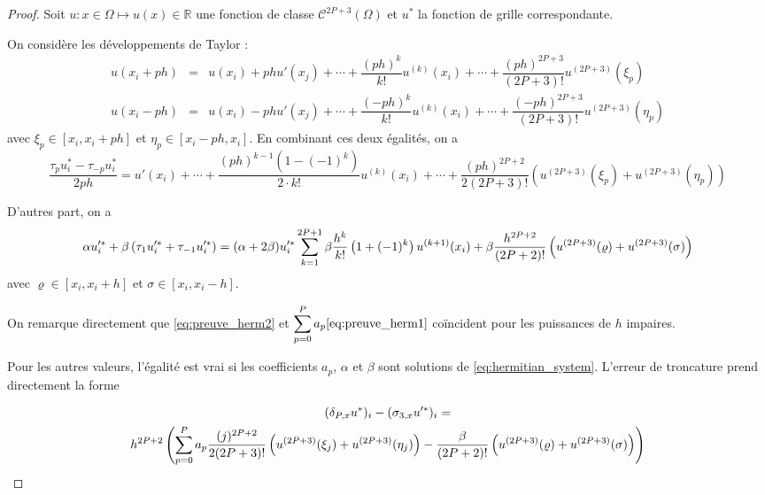 \begin{proof}
Soit $u : x \in \Omega \mapsto u(x) \in \mathbb{R}$ une fonction de classe $\mathcal{C}^{2P+3}( \Omega)$ et $u^*$ la fonction de grille correspondante.

On considère les développements de Taylor :
\begin{equation}
\begin{array}{rcl}
u(x_i + ph) & = & u(x_i) + p h u'(x_j) + \cdots + \dfrac{(ph)^k}{k!}u^{(k)}(x_i) + \cdots +\dfrac{(ph)^{2P+3}}{(2P+3)!} u^{(2P+3)}(\xi_p)\\
u(x_i - ph) & = & u(x_i) - p h u'(x_j) + \cdots + \dfrac{(-ph)^k}{k!}u^{(k)}(x_i) + \cdots +\dfrac{(-ph)^{2P+3}}{(2P+3)!} u^{(2P+3)}(\eta_p)
\end{array}
\end{equation}
avec $\xi_p \in [x_i, x_i+ph]$ et $\eta_p \in [x_i-ph, x_i]$. En combinant ces deux égalités, on a
\begin{equation}
\dfrac{\tau_pu^*_i - \tau_{-p} u^*_i}{2ph} = u'(x_i) + \cdots + \dfrac{(ph)^{k-1}(1 - (-1)^k)}{2 \cdot k!} u^{(k)}(x_i) + \cdots +\dfrac{(ph)^{2P+2}}{2(2P+3)!} \left( u^{(2P+3)}(\xi_p) + u^{(2P+3)}(\eta_p) \right)
\label{eq:preuve_herm1}
\end{equation}

D'autres part, on a 
\begin{equation}
\alpha u'^*_i + \beta \left( \tau_1 u'^*_{i} + \tau_{-1} u'^*_{i} \right) = (\alpha + 2 \beta) u'^*_i \displaystyle\sum\limits_{k=1}^{2P+1} \beta \dfrac{h^{k}}{k!} \left( 1 + (-1)^k \right) u^{(k+1)}(x_i)+ \beta \dfrac{h^{2P+2}}{(2P+2)!} \left(u^{(2P+3)}(\varrho) + u^{(2P+3)}(\sigma) \right) 
\label{eq:preuve_herm2}
\end{equation}
avec $\varrho \in [x_i, x_i + h]$ et $\sigma \in [x_i, x_i - h]$. 

On remarque directement que \eqref{eq:preuve_herm2} et $\displaystyle\sum\limits_{p=0}^P a_p  \eqref{eq:preuve_herm1}$ coïncident pour les puissances de $h$ impaires. 

Pour les autres valeurs, l'égalité est vrai si les coefficients $a_p$, $\alpha$ et $\beta$ sont solutions de \eqref{eq:hermitian_system}. L'erreur de troncature prend directement la forme 

\begin{multline}
(\delta_{P,x} u^*)_i - (\sigma_{3,x} u'^*)_i = \\
h^{2P+2} \left( \displaystyle\sum\limits_{p=0}^P a_p  \dfrac{(j)^{2P+2}}{2(2P+3)!} \left( u^{(2P+3)}(\xi_j) + u^{(2P+3)}(\eta_j) \right) - \dfrac{\beta}{(2P+2)!} \left(u^{(2P+3)}(\varrho) + u^{(2P+3)}(\sigma) \right) \right)
\end{multline}
\end{proof}

